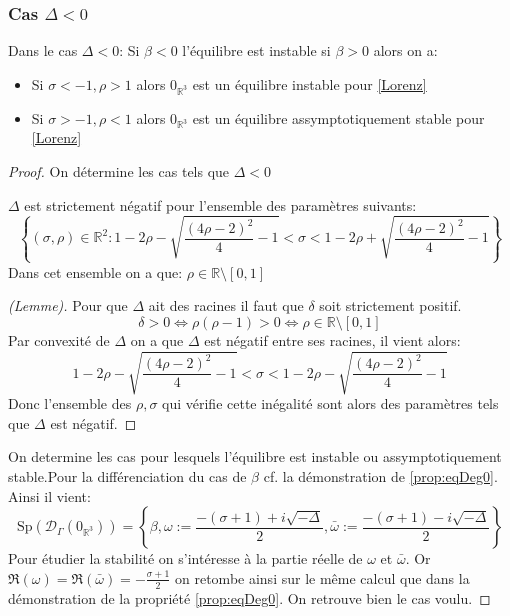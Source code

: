 \documentclass{article}
\newcommand{\R}{\mathbb{R}}
\newtheorem[M , nocut]{prop}{Proposition}[section]
\newtheorem[M , nocut]{definition}{Définition}
\newtheorem[M , nocut]{lemme}{Lemme}
\newtheorem[L , nocut]{thm}{Théoreme}
\newtheorem[M , nocut]{cor}{Corollaire}
\begin{document}
\subsubsection*{Cas $\Delta < 0$}

\begin{prop}
    \label{prop:eqDinf0}
    Dans le cas $\Delta<0$:
    Si $\beta <0$ l'équilibre est instable si $\beta>0$ alors on a:
    \begin{itemize}
        \item Si $\sigma < -1 , \rho > 1$ alors $0_{\R^3}$ est un équilibre instable pour \eqref{Lorenz}
        \item Si $\sigma > -1 , \rho < 1$ alors $0_{\R^3}$ est un équilibre assymptotiquement stable pour \eqref{Lorenz}
    \end{itemize}
\end{prop}
\begin{proof}
    On détermine les cas tels que $\Delta<0$
    \begin{lemme}
        $\Delta$ est strictement négatif pour l'ensemble des paramètres suivants:
        \[
        \left\{(\sigma,\rho)\in \R ^2 : 1-2 \rho - \sqrt{ \frac{(4\rho-2)^2}{4} -1 }< \sigma < 1-2 \rho + \sqrt{ \frac{(4\rho-2)^2}{4} -1 } \right\}    
        \]Dans cet ensemble on a que: $\rho \in \R \setminus [0,1]$ 
    \end{lemme}

    \begin{proof}[(Lemme)]
     Pour que $\Delta$ ait des racines il faut que $\delta$ soit strictement positif.
    \[
    \delta > 0 \Leftrightarrow \rho(\rho-1) > 0 \Leftrightarrow \rho \in \R \setminus [0,1]
    \]Par convexité de $\Delta$ on a que $\Delta$ est négatif entre ses racines, il vient alors:
    \[
        1-2 \rho - \sqrt{ \frac{(4\rho-2)^2}{4} -1 } < \sigma < 1-2 \rho - \sqrt{ \frac{(4\rho-2)^2}{4} -1 }
    \]Donc l'ensemble des $\rho,\sigma$ qui vérifie cette inégalité sont alors des paramètres tels que $\Delta$ est négatif.
    \end{proof}

    On determine les cas pour lesquels l'équilibre est instable ou assymptotiquement stable.Pour la différenciation du cas de $\beta$ cf. la démonstration de \ref{prop:eqDeg0}. Ainsi il vient:
    \[
        \mathrm{Sp}(\mathcal{D}_\Gamma (0_{\R^3})) = \left\{\beta, \omega := \frac{-(\sigma+1)+ i \sqrt{-\Delta}}{2}, \bar{\omega} := \frac{-(\sigma+1)- i \sqrt{-\Delta}}{2}\right\}
    \]Pour étudier la stabilité on s'intéresse à la partie réelle de $\omega$ et $\bar{\omega}$. Or $\Re (\omega) = \Re (\bar{\omega}) = -\frac{\sigma+1}{2}$ on retombe ainsi sur le même calcul que dans la démonstration de la propriété \ref{prop:eqDeg0}. On retrouve bien le cas voulu.
\end{proof}
\end{document}

